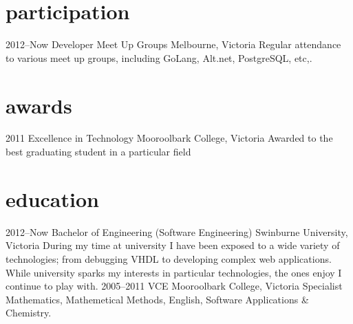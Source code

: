 \documentclass[]{friggeri-cv} %
\begin{document}
\pagebreak

\section{participation}

\begin{entrylist}

\entry
{2012--Now}
{Developer Meet Up Groups}
{Melbourne, Victoria}
{Regular attendance to various meet up groups, including GoLang, Alt.net,
PostgreSQL, etc,.}

\end{entrylist}

\section{awards}

\begin{entrylist}
\entry
{2011}
{Excellence in Technology}
{Mooroolbark College, Victoria}
{Awarded to the best graduating student in a particular field}
\end{entrylist}

\section{education}

\begin{entrylist}
\entry
{2012--Now}
{Bachelor {\normalfont of Engineering (Software Engineering)}}
{Swinburne University, Victoria}
{During my time at university I have been exposed to a wide variety of
technologies; from debugging VHDL to developing complex web applications.
While university sparks my interests in particular technologies, the ones enjoy
I continue to play with. }
\entry
{2005--2011}
{VCE {\normalfont}}
{Mooroolbark College, Victoria}
{Specialist Mathematics, Mathemetical Methods, English, Software Applications \& Chemistry.}
\end{entrylist}
\end{document}
